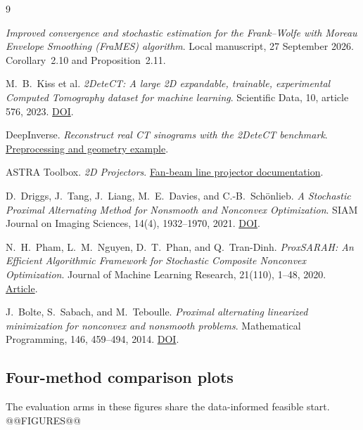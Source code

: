 \documentclass[11pt]{article}
\begin{document}
\begin{thebibliography}{9}

\emph{Improved convergence and stochastic estimation for the Frank--Wolfe with
Moreau Envelope Smoothing (FraMES) algorithm}.
Local manuscript, 27 September 2026. Corollary~2.10 and Proposition~2.11.

M.~B.~Kiss et al.
\emph{2DeteCT: A large 2D expandable, trainable, experimental Computed Tomography
dataset for machine learning}.
Scientific Data, 10, article 576, 2023.
\href{https://doi.org/10.1038/s41597-023-02484-6}{DOI}.

DeepInverse.
\emph{Reconstruct real CT sinograms with the 2DeteCT benchmark}.
\href{https://deepinv.org/auto_examples/external-libraries/demo_astra_2detect.html}{Preprocessing and geometry example}.

ASTRA Toolbox.
\emph{2D Projectors}.
\href{https://astra-toolbox.com/docs/proj2d.html#fan-beam}{Fan-beam line projector documentation}.

D.~Driggs, J.~Tang, J.~Liang, M.~E.~Davies, and C.-B.~Sch\"onlieb.
\emph{A Stochastic Proximal Alternating Method for Nonsmooth and Nonconvex Optimization}.
SIAM Journal on Imaging Sciences, 14(4), 1932--1970, 2021.
\href{https://doi.org/10.1137/20M1387213}{DOI}.

N.~H.~Pham, L.~M.~Nguyen, D.~T.~Phan, and Q.~Tran-Dinh.
\emph{ProxSARAH: An Efficient Algorithmic Framework for Stochastic Composite
Nonconvex Optimization}.
Journal of Machine Learning Research, 21(110), 1--48, 2020.
\href{https://www.jmlr.org/papers/v21/19-248.html}{Article}.

J.~Bolte, S.~Sabach, and M.~Teboulle.
\emph{Proximal alternating linearized minimization for nonconvex and nonsmooth problems}.
Mathematical Programming, 146, 459--494, 2014.
\href{https://doi.org/10.1007/s10107-013-0701-9}{DOI}.

\end{thebibliography}

\clearpage
\appendix

\begin{landscape}
\section{Four-method comparison plots}\label{app:four_method}
The evaluation arms in these figures share the data-informed feasible start.
@@FIGURES@@
\end{landscape}
\end{document}

